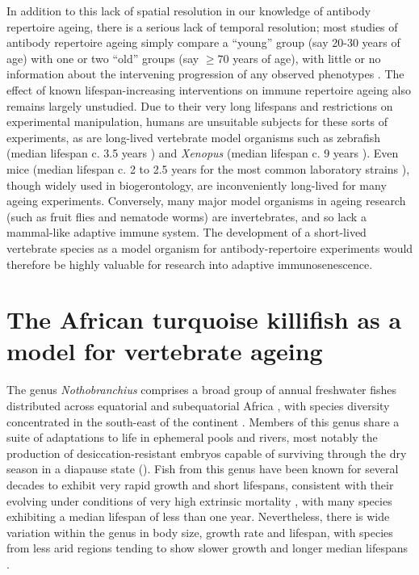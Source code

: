 In addition to this lack of spatial resolution in our knowledge of antibody repertoire ageing, there is a serious lack of temporal resolution; most studies of antibody repertoire ageing simply compare a ``young'' group (say 20-30 years of age) with one or two ``old'' groups (say $\geq70$ years of age), with little or no information about the intervening progression of any observed phenotypes \parencite{debourcy2017ageing,tabibiankeissar2016ageing}. The effect of known lifespan-increasing interventions on immune repertoire ageing also remains largely unstudied. Due to their very long lifespans and restrictions on experimental manipulation, humans are unsuitable subjects for these sorts of experiments, as are long-lived vertebrate model organisms such as zebrafish (median lifespan c. 3.5 years \parencite{gerhard2002zebrafish}) and \textit{Xenopus} (median lifespan c. 9 years \parencite{bowler1977longevity}). Even mice (median lifespan c. 2 to 2.5 years for the most common laboratory strains \parencite{yuan2009aging}), though widely used in biogerontology, are inconveniently long-lived for many ageing experiments. Conversely, many major model organisms in ageing research (such as fruit flies and nematode worms) are invertebrates, and so lack a mammal-like adaptive immune system. The development of a short-lived vertebrate species as a model organism for antibody-repertoire experiments would therefore be highly valuable for research into adaptive immunosenescence.

\section{The African turquoise killifish as a model for vertebrate ageing}
\label{sec:intro_killifish}

The genus \textit{Nothobranchius} comprises a broad group of annual freshwater fishes distributed across equatorial and subequatorial Africa \parencite{valdesalici2003lifespan}, with species diversity concentrated in the south-east of the continent \parencite{genade2005annual}. Members of this genus share a suite of adaptations to life in ephemeral pools and rivers, most notably the production of desiccation-resistant embryos capable of surviving through the dry season in a diapause state \parencite{genade2005annual} (). Fish from this genus have been known for several decades to  exhibit very rapid growth and short lifespans, consistent with their evolving under conditions of very high extrinsic mortality \parencite{valdesalici2003lifespan}, with many species exhibiting a median lifespan of less than one year. Nevertheless, there is wide variation within the genus in body size, growth rate and lifespan, with species from less arid regions tending to show slower growth and longer median lifespans \parencite{genade2005annual}.

